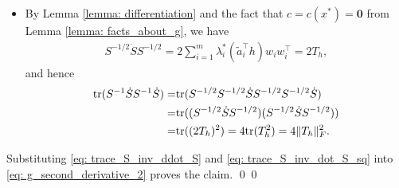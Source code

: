 \documentclass[smallextended]{svjour3}
\let\springerproof\proof
\let\endspringerproof\endproof
\renewenvironment{proof}{\springerproof}{%
  \ifhmode\qed\else\leavevmode\qed\fi\endspringerproof}
\newcommand{\tr}{\mathrm{tr}}
\begin{document}
\begin{proof}
\begin{itemize}
\begin{align}
            = & 6\sum_{i=1}^m \lambda^*_i(\tilde{a}_i^\top h)^2\|w_i\|^2 - 2\|p_h\|^2  \notag \\
            = & 6n\sum_{i=1}^m \lambda^*_i(\tilde{a}_i^\top h)^2 - 2\|p_h\|^2. \notag
        \end{align}
        Moreover, it holds that 
        \begin{align}
            &\sum_{i=1}^m \lambda^*_i(\tilde{a}_i^\top h)^2  = \sum_{i=1}^m \lambda^*_i(w_i^\top p_h)^2 = p_h^\top \left(\sum_{i=1}^m \lambda^*_i w_iw_i^\top\right) p_h,\notag \\
            &\sum_{i=1}^m \lambda^*_i w_iw_i^\top = S^{-1/2}\left(\sum_{i=1}^m \lambda_i^*\tilde{a}_i\tilde{a}_i^\top \right)S^{-1/2} = S^{-1/2}SS^{-1/2} = I_n. \notag 
        \end{align}
        As a result, we have 
        \begin{align}\label{eq: trace_S_inv_ddot_S}
            \tr(S^{-1}\ddot{S}) = 2(3n-1)\|p_h\|^2.
        \end{align}

        \item By Lemma \ref{lemma: differentiation} and the fact that
        $c=c(x^*)=\mathbf{0}$ from Lemma \ref{lemma: facts_about_g}, we have
        \begin{align*}
            S^{-1/2} \dot{S} S^{-1/2} = 2\sum_{i=1}^m \lambda_i^* (\tilde{a}_i^\top h)w_iw_i^\top = 2T_h,
        \end{align*}
        and hence 
        \begin{align}\label{eq: trace_S_inv_dot_S_sq}
            \tr(S^{-1}\dot{S}S^{-1}\dot{S})  = &   \tr(S^{-1/2}S^{-1/2}\dot{S}S^{-1/2}S^{-1/2}\dot{S}) \notag \\
            = & \tr((S^{-1/2} \dot{S} S^{-1/2} )(S^{-1/2} \dot{S} S^{-1/2})) \notag  \\
            = & \tr((2T_h)^2) = 4\tr(T_h^2) = 4\|T_h\|_F^2.
        \end{align}
    \end{itemize}
    Substituting \eqref{eq: trace_S_inv_ddot_S} and
    \eqref{eq: trace_S_inv_dot_S_sq} into \eqref{eq: g_second_derivative_2} proves the claim.
\end{proof}
\end{document}
